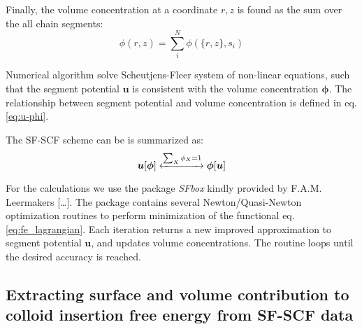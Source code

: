 \documentclass[10pt, a4paper]{article}
\begin{document}
\begin{multicols}{2}
Finally, the volume concentration at a coordinate $r, z$ is found as the sum over the all chain segments:
\begin{equation}
    \phi(r, z) = \sum_{i}^{N} \phi(\{r, z\}, s_{i})
\end{equation}

Numerical algorithm solve Scheutjens-Fleer system of non-linear equations, such that the segment potential $\mathbf{u}$ is consistent with the volume concentration $\mathbf{\phi}$.
The relationship between segment potential and volume concentration is defined in eq. \ref{eq:u-phi}.

The SF-SCF scheme can be is summarized as:
\begin{equation}
    \bm{u}[\bm{\phi}] \xleftrightarrow[]{\sum_{X} \phi_X = 1} \bm{\phi}[\bm{u}]
\end{equation}

For the calculations we use the package \emph{SFbox} kindly provided by F.A.M. Leermakers [\dots].
The package contains several Newton/Quasi-Newton optimization routines to perform minimization of the functional eq.\ref{eq:fe_lagrangian}.
Each iteration returns a new improved approximation to segment potential $\mathbf{u}$, and updates volume concentrations.
The routine loops until the desired accuracy is reached.


\end{multicols}
\subsection*{Extracting surface and volume contribution to colloid insertion free energy from SF-SCF data}
\end{document}
